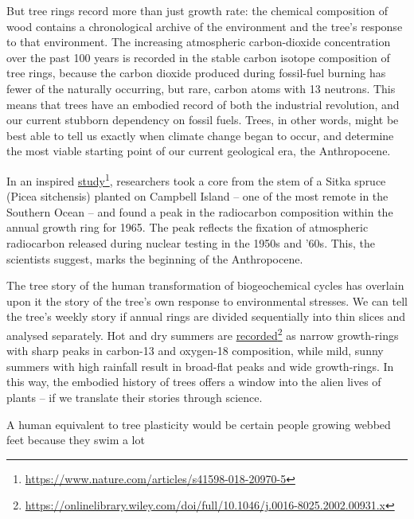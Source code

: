 \documentclass[../main.tex]{subfiles}
\begin{document}
\begin{multicols}{2}
{But tree rings record more than just growth rate: the chemical composition of wood contains a chronological archive of the environment and the tree’s response to that environment. The increasing atmospheric carbon-dioxide concentration over the past 100 years is recorded in the stable carbon isotope composition of tree rings, because the carbon dioxide produced during fossil-fuel burning has fewer of the naturally occurring, but rare, carbon atoms with 13 neutrons. This means that trees have an embodied record of both the industrial revolution, and our current stubborn dependency on fossil fuels. Trees, in other words, might be best able to tell us exactly when climate change began to occur, and determine the most viable starting point of our current geological era, the Anthropocene. 

In an inspired \href{https://www.nature.com/articles/s41598-018-20970-5}{study}\footnote{\url{https://www.nature.com/articles/s41598-018-20970-5}}, researchers took a core from the stem of a Sitka spruce (Picea sitchensis) planted on Campbell Island – one of the most remote in the Southern Ocean – and found a peak in the radiocarbon composition within the annual growth ring for 1965. The peak reflects the fixation of atmospheric radiocarbon released during nuclear testing in the 1950s and ’60s. This, the scientists suggest, marks the beginning of the Anthropocene. 

The tree story of the human transformation of biogeochemical cycles has overlain upon it the story of the tree’s own response to environmental stresses. We can tell the tree’s weekly story if annual rings are divided sequentially into thin slices and analysed separately. Hot and dry summers are \href{https://onlinelibrary.wiley.com/doi/full/10.1046/j.0016-8025.2002.00931.x}{recorded}\footnote{\url{https://onlinelibrary.wiley.com/doi/full/10.1046/j.0016-8025.2002.00931.x}} as narrow growth-rings with sharp peaks in carbon-13 and oxygen-18 composition, while mild, sunny summers with high rainfall result in broad-flat peaks and wide growth-rings. In this way, the embodied history of trees offers a window into the alien lives of plants – if we translate their stories through science. 

\begin{pullquote}
 A human equivalent to tree plasticity would be certain people growing webbed feet because they swim a lot 
\end{pullquote}

}
\end{multicols}
\end{document}
